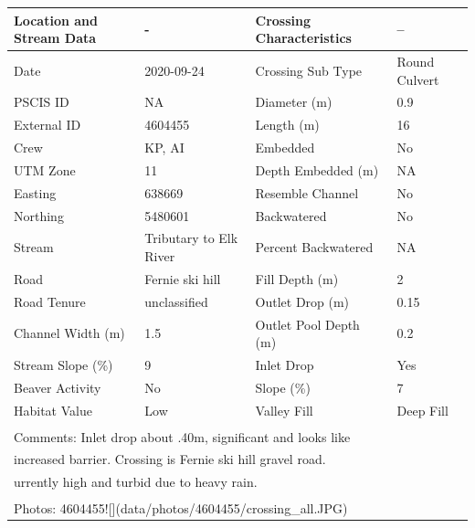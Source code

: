 \documentclass[
]{book}
\begin{document}
\begin{tabular}{l|l|l|l}
\hline
Location and Stream Data & - & Crossing Characteristics & --\\
\hline
Date & 2020-09-24 & Crossing Sub Type & Round Culvert\\
\hline
PSCIS ID & NA & Diameter (m) & 0.9\\
\hline
External ID & 4604455 & Length (m) & 16\\
\hline
Crew & KP, AI & Embedded & No\\
\hline
UTM Zone & 11 & Depth Embedded (m) & NA\\
\hline
Easting & 638669 & Resemble Channel & No\\
\hline
Northing & 5480601 & Backwatered & No\\
\hline
Stream & Tributary to Elk River & Percent Backwatered & NA\\
\hline
Road & Fernie ski hill & Fill Depth (m) & 2\\
\hline
Road Tenure & unclassified & Outlet Drop (m) & 0.15\\
\hline
Channel Width (m) & 1.5 & Outlet Pool Depth (m) & 0.2\\
\hline
Stream Slope (\%) & 9 & Inlet Drop & Yes\\
\hline
Beaver Activity & No & Slope (\%) & 7\\
\hline
Habitat Value & Low & Valley Fill & Deep Fill\\
\hline
\multicolumn{4}{l}{\textsuperscript{} Comments: Inlet drop about .40m, significant and looks like}\\
\multicolumn{4}{l}{increased barrier. Crossing is Fernie ski hill gravel road.}\\
\multicolumn{4}{l}{urrently high and turbid due to heavy rain.}\\
\multicolumn{4}{l}{\textsuperscript{} Photos: 4604455![](data/photos/4604455/crossing\_all.JPG)}\\
\end{tabular}
\end{document}
